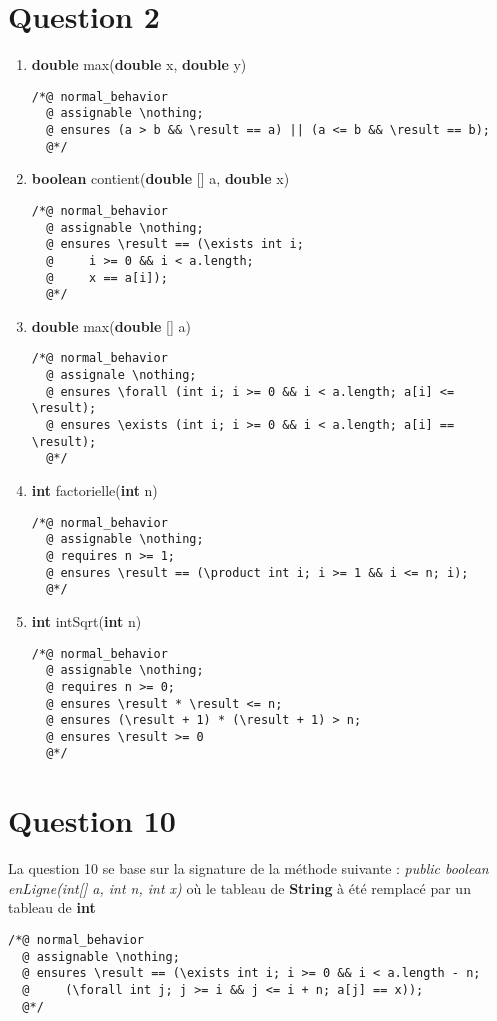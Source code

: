 \documentclass{article}
\begin{document}
\section{Question 2}
\begin{enumerate}
	\item \textbf{double} max(\textbf{double} x, \textbf{double} y)
\begin{lstlisting}
/*@ normal_behavior
  @ assignable \nothing;
  @ ensures (a > b && \result == a) || (a <= b && \result == b);
  @*/
\end{lstlisting}
	\item \textbf{boolean} contient(\textbf{double} [] a, \textbf{double} x)
\begin{lstlisting}
/*@ normal_behavior
  @ assignable \nothing;
  @ ensures \result == (\exists int i;
  @		i >= 0 && i < a.length;
  @		x == a[i]);
  @*/
\end{lstlisting}
	\item \textbf{double} max(\textbf{double} [] a)
\begin{lstlisting}
/*@ normal_behavior
  @ assignale \nothing;
  @ ensures \forall (int i; i >= 0 && i < a.length; a[i] <= \result);
  @ ensures \exists (int i; i >= 0 && i < a.length; a[i] == \result);
  @*/
\end{lstlisting}
	\item \textbf{int} factorielle(\textbf{int} n)
\begin{lstlisting}
/*@ normal_behavior
  @ assignable \nothing;
  @ requires n >= 1;
  @ ensures \result == (\product int i; i >= 1 && i <= n; i);
  @*/
\end{lstlisting}
	\item \textbf{int} intSqrt(\textbf{int} n)
\begin{lstlisting}
/*@ normal_behavior
  @ assignable \nothing;
  @ requires n >= 0;
  @ ensures \result * \result <= n;
  @ ensures (\result + 1) * (\result + 1) > n;
  @ ensures \result >= 0
  @*/
\end{lstlisting}
\end{enumerate}

\section{Question 10}
La question 10 se base sur la signature de la méthode suivante : \textit{public boolean enLigne(int[] a, int n, int x)} où le tableau de \textbf{String} à été remplacé par un tableau de \textbf{int}
\begin{lstlisting}
/*@ normal_behavior
  @ assignable \nothing;
  @ ensures \result == (\exists int i; i >= 0 && i < a.length - n;
  @		(\forall int j; j >= i && j <= i + n; a[j] == x));
  @*/
\end{lstlisting}
\end{document}
